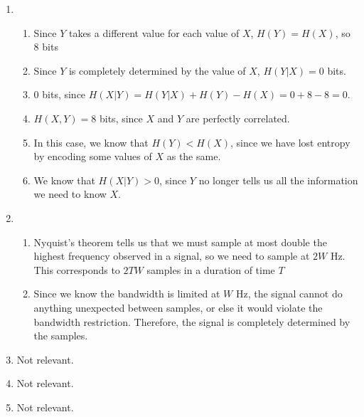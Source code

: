 


\begin{enumerate}[label=(\alph*)]

  \item
    \begin{enumerate}[label=(\roman*)]

      \item
        Since $Y$ takes a different value for each value of $X$, $H(Y) = H(X)$, so 8 bits

      \item
        Since $Y$ is completely determined by the value of $X$, $H(Y|X) = 0$ bits.

      \item
        0 bits, since $H(X|Y) = H(Y|X) + H(Y) - H(X) = 0 + 8 - 8 = 0$.

      \item
        $H(X,Y) = 8$ bits, since $X$ and $Y$ are perfectly correlated.

      \item
        In this case, we know that $H(Y) < H(X)$, since we have lost entropy by encoding some values of $X$ as the same.

      \item
        We know that $H(X|Y) > 0$, since $Y$ no  longer tells us all the information we need to know $X$.

        
    \end{enumerate}

  \item
    \begin{enumerate}[label=(\roman*)]

      \item
        Nyquist's theorem tells us that we must sample at most double the highest frequency observed in a signal, so we need to sample at $2W$ Hz. This corresponds to $2TW$ samples in a duration of time $T$

      \item
        Since we know the bandwidth is limited at $W$ Hz, the signal cannot do anything unexpected between samples, or else it would violate the bandwidth restriction. Therefore, the signal is completely determined by the samples.

    \end{enumerate}

  \item
    Not relevant.

  \item
    Not relevant.

  \item
    Not relevant.
        
    \end{enumerate}

